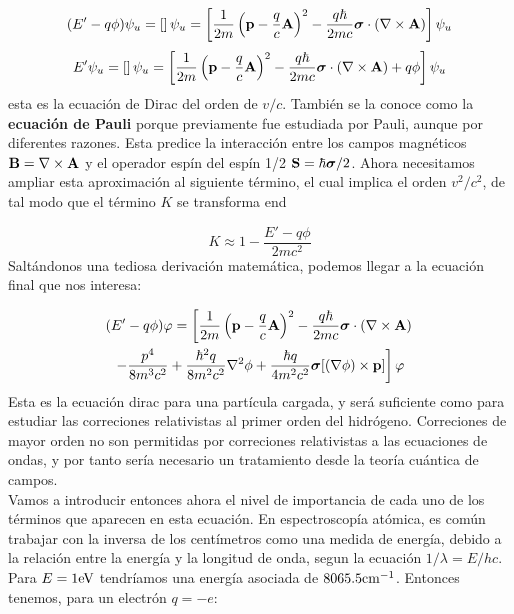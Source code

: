 \begin{equation}
    (E'-q\phi)\psi_u = \left[  \right]\psi_u = \left[ \frac{1}{2m}\left( \mathbf{p}- \frac{q}{c}\mathbf{A} \right)^2 - \frac{q\hbar}{2mc}\boldsymbol{\sigma} \cdot (\nabla \times \mathbf{A}) \right] \psi_u
\end{equation}
\begin{equation}
 E'\psi_u = \left[  \right]\psi_u = \left[ \frac{1}{2m}\left( \mathbf{p}- \frac{q}{c}\mathbf{A} \right)^2 - \frac{q\hbar}{2mc}\boldsymbol{\sigma} \cdot (\nabla \times \mathbf{A}) + q \phi \right] \psi_u
\end{equation}
esta es la ecuación de Dirac del orden de $v/c$. También se la conoce como la \textbf{ecuación de Pauli} porque previamente fue estudiada por Pauli, aunque por diferentes razones. Esta predice la interacción entre los campos magnéticos $\mathbf{B} = \nabla \times \mathbf{A}$ y el operador espín del espín 1/2 $\mathbf{S} = \hbar \boldsymbol{\sigma} /2$. Ahora necesitamos ampliar esta aproximación al siguiente término, el cual implica el orden $v^2/c^2$, de tal modo que el término $K$ se transforma end

\begin{equation}
    K \approx 1- \frac{E' - q \phi}{2mc^2}
\end{equation}
Saltándonos una tediosa derivación matemática, podemos llegar a la ecuación final que nos interesa:

\begin{multline}
    (E'-q\phi) \varphi = \left[ \frac{1}{2m} \left( \mathbf{p}-\frac{q}{c}\mathbf{A} \right)^2 - \frac{q\hbar}{2mc} \boldsymbol{\sigma} \cdot (\nabla \times \mathbf{A})  \right. \\
    \left. - \frac{p^4}{8 m^3 c^2} + \frac{\hbar^2 q}{8 m^2 c^2} \nabla^2 \phi + \frac{ \hbar q}{4m^2 c^2} \boldsymbol{\sigma} [(\nabla \phi)\times \mathbf{p}] \right] \varphi
    \label{Ec:01-03-15}
\end{multline}
Esta es la ecuación dirac para una partícula cargada, y será suficiente como para estudiar las correciones relativistas al primer orden del hidrógeno. Correciones de mayor orden no son permitidas por correciones relativistas a las ecuaciones de ondas, y por tanto sería necesario un tratamiento desde la teoría cuántica de campos. \\

Vamos a introducir entonces ahora el nivel de importancia de cada uno de los términos que aparecen en esta ecuación. En espectroscopía atómica, es común trabajar con la inversa de los centímetros como una medida de energía, debido a la relación entre la energía y la longitud de onda, segun la ecuación $1/\lambda = E/hc$. Para $E=1\text{eV}$ tendríamos una energía asociada de $8065.5 \text{cm}^{-1}$. Entonces tenemos, para un electrón $q=-e$:

